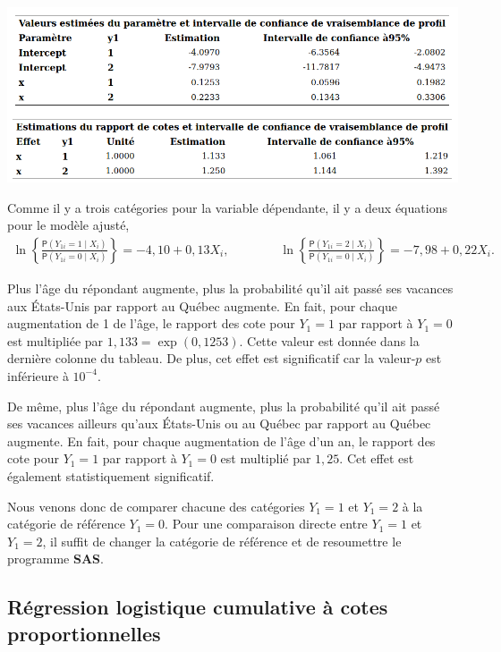 \documentclass[
  11pt,
  letterpaper,
]{book}
\theoremstyle{definition}
\theoremstyle{definition}
\theoremstyle{definition}
\theoremstyle{remark}
\begin{document}
\begin{center}\includegraphics[width=0.82\linewidth]{figures/03-logistic-e25} \end{center}

Comme il y a trois catégories pour la variable dépendante, il y a deux équations pour le modèle ajusté,
\begin{align*}
\ln \left\{\frac{{\mathsf P}\left(Y_{1i}=1 \mid X_i\right)}{{\mathsf P}\left(Y_{1i}=0 \mid X_i\right)} \right\} = -4,10 + 0,13X_i, \qquad \qquad \ln \left\{\frac{{\mathsf P}\left(Y_{1i}=2 \mid X_i\right)}{{\mathsf P}\left(Y_{1i}=0 \mid X_i\right)} \right\} = -7,98+0,22X_i. 
\end{align*}

Plus l'âge du répondant augmente, plus la probabilité qu'il ait passé ses vacances aux États-Unis par rapport au Québec augmente. En fait, pour chaque augmentation de 1 de l'âge, le rapport des cote pour \(Y_1=1\) par rapport à \(Y_1=0\) est multipliée par \({1,133}=\exp({0,1253})\). Cette valeur est donnée dans la dernière colonne du tableau. De plus, cet effet est significatif car la valeur-\(p\) est inférieure à \(10^{-4}\).

De même, plus l'âge du répondant augmente, plus la probabilité qu'il ait passé ses vacances ailleurs qu'aux États-Unis ou au Québec par rapport au Québec augmente. En fait, pour chaque augmentation de l'âge d'un an, le rapport des cote pour \(Y_1=1\) par rapport à \(Y_1=0\) est multiplié par \({1,25}\). Cet effet est également statistiquement significatif.

Nous venons donc de comparer chacune des catégories \(Y_1=1\) et \(Y_1=2\) à la catégorie de référence \(Y_1=0\). Pour une comparaison directe entre \(Y_1=1\) et \(Y_1=2\), il suffit de changer la catégorie de référence et de resoumettre le programme \textbf{SAS}.

\hypertarget{ruxe9gression-logistique-cumulative-uxe0-cotes-proportionnelles}{%
\subsection{Régression logistique cumulative à cotes proportionnelles}\label{ruxe9gression-logistique-cumulative-uxe0-cotes-proportionnelles}}
\end{document}
